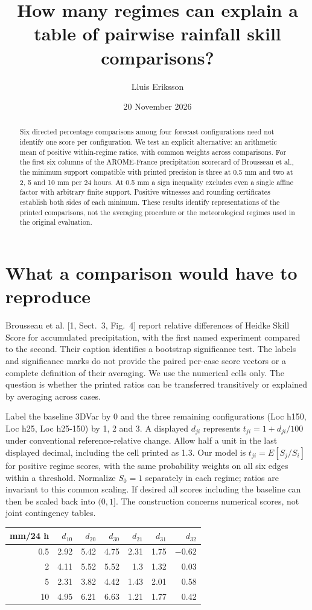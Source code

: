 \documentclass[11pt]{article}
\title{How many regimes can explain a table of pairwise rainfall skill comparisons?}
\author{Lluis Eriksson}\date{20 November 2026}
\begin{document}
\maketitle
\begin{abstract}
Six directed percentage comparisons among four forecast configurations need not identify one score per configuration. We test an explicit alternative: an arithmetic mean of positive within-regime ratios, with common weights across comparisons. For the first six columns of the AROME-France precipitation scorecard of Brousseau et al., the minimum support compatible with printed precision is three at 0.5 mm and two at 2, 5 and 10 mm per 24 hours. At 0.5 mm a sign inequality excludes even a single affine factor with arbitrary finite support. Positive witnesses and rounding certificates establish both sides of each minimum. These results identify representations of the printed comparisons, not the averaging procedure or the meteorological regimes used in the original evaluation.
\end{abstract}
\section{What a comparison would have to reproduce}
Brousseau et al. [1, Sect.~3, Fig.~4] report relative differences of Heidke Skill Score for accumulated precipitation, with the first named experiment compared to the second. Their caption identifies a bootstrap significance test. The labels and significance marks do not provide the paired per-case score vectors or a complete definition of their averaging. We use the numerical cells only. The question is whether the printed ratios can be transferred transitively or explained by averaging across cases.

Label the baseline 3DVar by 0 and the three remaining configurations (Loc h150, Loc h25, Loc h25-150) by 1, 2 and 3. A displayed $d_{ji}$ represents $t_{ji}=1+d_{ji}/100$ under conventional reference-relative change. Allow half a unit in the last displayed decimal, including the cell printed as 1.3. Our model is $t_{ji}=E[S_j/S_i]$ for positive regime scores, with the same probability weights on all six edges within a threshold. Normalize $S_0=1$ separately in each regime; ratios are invariant to this common scaling. If desired all scores including the baseline can then be scaled back into $(0,1]$. The construction concerns numerical scores, not joint contingency tables.

\begin{center}\small
\begin{tabular}{rrrrrrr}
\toprule
mm/24 h & $d_{10}$&$d_{20}$&$d_{30}$&$d_{21}$&$d_{31}$&$d_{32}$\\\midrule
0.5&2.92&5.42&4.75&2.31&1.75&$-0.62$\\
2&4.11&5.52&5.52&1.3&1.32&0.03\\
5&2.31&3.82&4.42&1.43&2.01&0.58\\
10&4.95&6.21&6.63&1.21&1.77&0.42\\\bottomrule
\end{tabular}
\end{center}
\newpage
\end{document}
